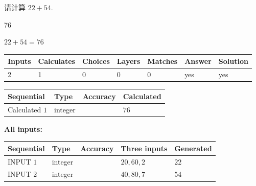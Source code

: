\documentclass{ctexart}
\begin{document}
  
 
请计算 $ %
22 +  %
54 $.
 
 
 
\noindent{}
 
 

76
 
 
\noindent{}
 
 

 
 
 
\noindent{}
 
 

$ %
22 +  %
54=   %
76$
 
 
\noindent{}
 
 

 
   
   
   
   
\noindent\begin{tabular}{|l|l|l|l|l|l|l|}
 \hline
Inputs & Calculates & Choices & Layers & Matches & Answer & Solution \\ \hline
 2  & 
 1  & 
 0
  & 
 0  & 
 0  & 
  yes & 
  yes 
  \\ \hline
 \end{tabular}
   
   
   
   
\noindent{}
   
   
  
  
\noindent\begin{tabular}{|l|l|l|l|}
\hline
 Sequential & Type & Accuracy & Calculated \\ 
\hline
 
 
  Calculated $  1 $ & integer &  & 
  $ 76 $ 
 \\  \hline  
 \end{tabular}
   
   
   
   
\noindent\vspace{0.1in}\hspace{-0.08in} {\textbf{\Large{All inputs: }}}
   
   
  
  
\noindent\begin{tabular}{|l|l|l|l|l|}
\hline
 Sequential & Type & Accuracy & Three inputs & Generated \\ 
\hline
 
 
  INPUT $  1 $ & integer &  & $
 20
 , 
 60
 , 
 2
 $ & $ 22 $ 
 \\  \hline  
 
 
  INPUT $  2 $ & integer &  & $
 40
 , 
 80
 , 
 7
 $ & $ 54 $ 
 \\  \hline  
 \end{tabular}
   
\end{document}
